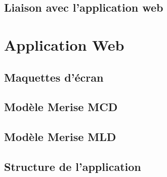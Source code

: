 \documentclass[a4paper]{article}
\begin{document}
	\subsection{Liaison avec l'application web}
		
		
\newpage

\section{Application Web}

	\subsection{Maquettes d'écran}
		
\newpage

	\subsection{Modèle Merise MCD}
		
\newpage

	\subsection{Modèle Merise MLD}
		
\newpage

	\subsection{Structure de l'application}
		

\newpage
\tableofcontents
\end{document}

